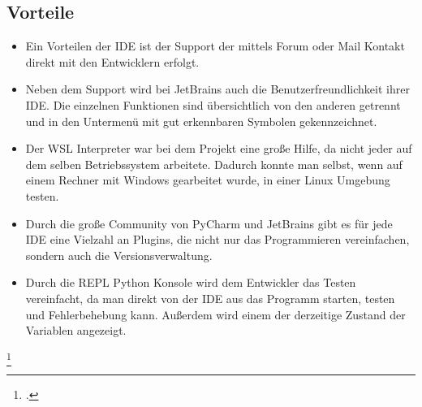 \subsection{Vorteile}
\fib{}
\noindent
\begin{itemize}
\item Ein Vorteilen der IDE ist der Support der mittels Forum oder Mail Kontakt direkt mit den Entwicklern erfolgt.
\item Neben dem Support wird bei JetBrains auch die Benutzerfreundlichkeit ihrer IDE. Die einzelnen Funktionen sind übersichtlich von den anderen getrennt und in den Untermenü mit gut erkennbaren Symbolen gekennzeichnet.
\item Der WSL Interpreter war bei dem Projekt eine große Hilfe, da nicht jeder auf dem selben Betriebssystem arbeitete. Dadurch konnte man selbst, wenn auf einem Rechner mit Windows gearbeitet wurde, in einer Linux Umgebung testen.
\item Durch die große Community von PyCharm und JetBrains gibt es für jede IDE eine Vielzahl an Plugins, die nicht nur das Programmieren vereinfachen, sondern auch die Versionsverwaltung.
\item Durch die REPL Python Konsole wird dem Entwickler das Testen vereinfacht, da man direkt von der IDE aus das Programm starten, testen und Fehlerbehebung kann. Außerdem wird einem der derzeitige Zustand der Variablen angezeigt.
\end{itemize}
\footcite{noauthor_features_nodate}